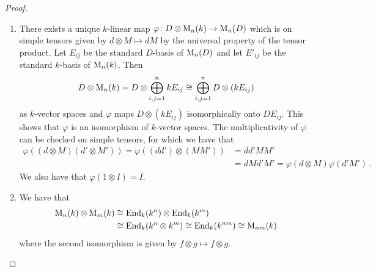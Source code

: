 \begin{proof}
  \leavevmode
  \begin{enumerate}
    \item
      There exists a unique $k$-linear map $\varphi \colon D \otimes \operatorname{M}_n(k) \to \operatorname{M}_n(D)$ which is on simple tensors given by $d \otimes M \mapsto dM$ by the universal property of the tensor product.
      Let $E_{ij}$ be the standard $D$-basis of $\operatorname{M}_n(D)$ and let $E'_{ij}$ be the standard $k$-basis of $\operatorname{M}_n(k)$.
      Then
      \[
              D \otimes \operatorname{M}_n(k)
        =     D \otimes \bigoplus_{i,j=1}^n k E_{ij}
        \cong \bigoplus_{i,j=1}^n D \otimes (k E_{ij})
      \]
      as $k$-vector spaces and $\varphi$ maps $D \otimes (k E_{ij})$ isomorphically onto $D E_{ij}$.
      This shows that $\varphi$ is an isomorphism of $k$-vector spaces.
      The multiplicativity of $\varphi$ can be checked on simple tensors, for which we have that 
      \begin{align*}
            \varphi( (d \otimes M) (d' \otimes M') )
         =  \varphi( (d d') \otimes (M M') )
        &=  d d' M M' \\
        &=  d M d' M'
         =  \varphi(d \otimes M) \varphi(d' M') \,.
      \end{align*}
      We also have that $\varphi(1 \otimes I) = I$.
    \item
      We have that
      \begin{align*}
                \operatorname{M}_n(k) \otimes \operatorname{M}_m(k)
        &\cong  \operatorname{End}_k(k^n) \otimes \operatorname{End}_k(k^m) \\
        &\cong  \operatorname{End}_k(k^n \otimes k^m)
         \cong \operatorname{End}_k(k^{nm})
         \cong \operatorname{M}_{nm}(k)
      \end{align*}
      where the second isomorphism is given by $f \otimes g \mapsto f \otimes g$.
    \qedhere
  \end{enumerate}
\end{proof}


